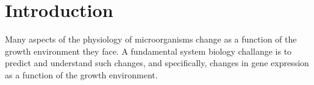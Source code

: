 \section{Introduction}
Many aspects of the physiology of microorganisms change as a function of the growth environment they face.
A fundamental system biology challange is to predict and understand such changes, and specifically, changes in gene expression as a function of the growth environment.